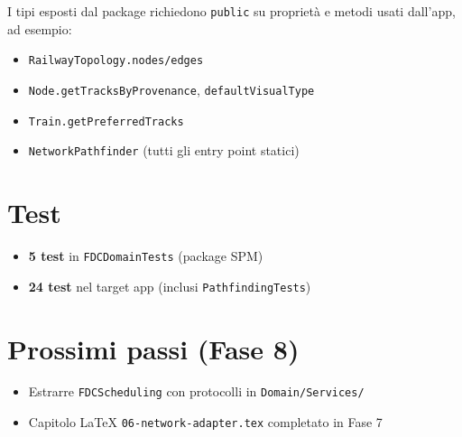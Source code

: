 I tipi esposti dal package richiedono \texttt{public} su proprietà e metodi
usati dall'app, ad esempio:

\begin{itemize}
  \item \texttt{RailwayTopology.nodes/edges}
  \item \texttt{Node.getTracksByProvenance}, \texttt{defaultVisualType}
  \item \texttt{Train.getPreferredTracks}
  \item \texttt{NetworkPathfinder} (tutti gli entry point statici)
\end{itemize}

\section{Test}

\begin{itemize}
  \item \textbf{5 test} in \texttt{FDCDomainTests} (package SPM)
  \item \textbf{24 test} nel target app (inclusi \texttt{PathfindingTests})
\end{itemize}

\section{Prossimi passi (Fase 8)}

\begin{itemize}
  \item Estrarre \texttt{FDCScheduling} con protocolli in \texttt{Domain/Services/}
  \item Capitolo LaTeX \texttt{06-network-adapter.tex} completato in Fase 7
\end{itemize}
